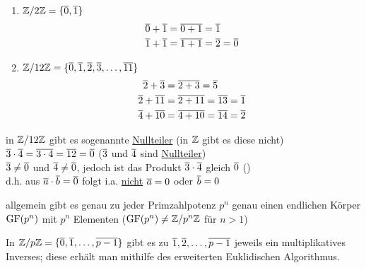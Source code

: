\Bsps
\begin{enumerate}
	\item $\mathbb{Z}/2\mathbb{Z}=\{\overline{0}, \overline{1}\}$
	\begin{align*}
	\overline{0}+\overline{1} &= \overline{0+1} = \overline{1}\\
	\overline{1}+\overline{1} &= \overline{1+1} = \overline{2} = \overline{0}\\
	\end{align*}
	
	\item $\mathbb{Z}/12\mathbb{Z}=\{\overline{0}, \overline{1}, \overline{2}, \overline{3}, \ldots, \overline{11}\}$
	\begin{align*}
	\overline{2}+\overline{3} &= \overline{2+3} = \overline{5}\\
	\overline{2}+\overline{11} &= \overline{2+11} = \overline{13} = \overline{1}\\
	\overline{4}+\overline{10} &= \overline{4+10} = \overline{14} = \overline{2}\\
	\end{align*}
\end{enumerate}

in $\mathbb{Z}/12\mathbb{Z}$ gibt es sogenannte \ul{Nullteiler} (in $\mathbb{Z}$ gibt es diese nicht)\\
$\overline{3} \cdot \overline{4} = \overline{3\cdot 4}= \overline{12} = \overline{0}$ ($\overline{3}$ und $\overline{4}$ sind \ul{Nullteiler})\\
$\overline{3}\ne \overline{0}$ und $\overline{4}\ne \overline{0}$, jedoch ist das Produkt $\overline{3} \cdot \overline{4}$ gleich $\overline{0}$ ()\\
d.h. aus $\overline{a} \cdot \overline{b} = \overline{0}$ folgt i.a. \ul{nicht} $\overline{a} = 0$ oder $\overline{b} = 0$


\Bem allgemein gibt es genau zu jeder Primzahlpotenz $p^n$ genau einen endlichen Körper $\mathbin\text{GF}(p^n)$ mit $p^n$ Elementen ($\mathbin\text{GF}(p^n) \ne \mathbb{Z}/p^n\mathbb{Z}$ für $n>1$)

\Bem In $\mathbb{Z}/p\mathbb{Z} = \{\overline{0},\overline{1},\ldots,\overline{p-1}\}$ gibt es zu $\overline{1},\overline{2},\ldots,\overline{p-1}$ jeweils ein multiplikatives Inverses; diese erhält man mithilfe des erweiterten Euklidischen Algorithmus.


